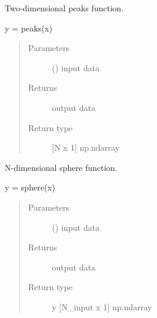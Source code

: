 \documentclass[letterpaper,10pt,english,openany,oneside]{sphinxmanual}
\begin{document}
\begin{fulllineitems}
\label{\detokenize{pygpc:pygpc.testfun.peaks}}
Two-dimensional peaks function.

y = peaks(x)
\begin{quote}\begin{description}
\item[{Parameters}] \leavevmode
{} (\sphinxstyleliteralemphasis{\sphinxupquote{{[}}}\sphinxstyleliteralemphasis{\sphinxupquote{{]} }}) \textendash{} input data

\item[{Returns}] \leavevmode
{} \textendash{} output data

\item[{Return type}] \leavevmode
{[}N x 1{]} np.ndarray

\end{description}\end{quote}

\end{fulllineitems}


\begin{fulllineitems}
\label{\detokenize{pygpc:pygpc.testfun.sphere}}
N-dimensional sphere function.

y = sphere(x)
\begin{quote}\begin{description}
\item[{Parameters}] \leavevmode
{} (\sphinxstyleliteralemphasis{\sphinxupquote{{[}}}\sphinxstyleliteralemphasis{\sphinxupquote{{]} }}) \textendash{} input data

\item[{Returns}] \leavevmode
output data

\item[{Return type}] \leavevmode
y {[}N\_input x 1{]} np.ndarray

\end{description}\end{quote}

\end{fulllineitems}
\end{document}
